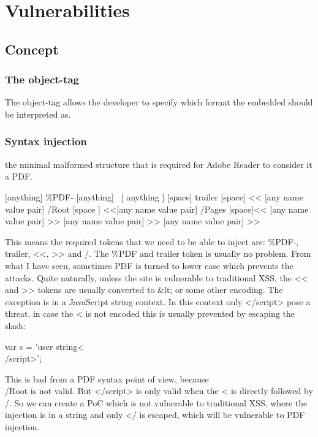 \documentclass[10pt, conference, compsocconf]{IEEEtran}
\begin{document}
\section{Vulnerabilities}


\subsection{Concept}



\subsubsection{The object-tag}

The object-tag allows the developer to specify which format 
the embedded should be interpreted as. 

\subsubsection{Syntax injection}

the minimal malformed structure that is required for Adobe 
Reader to consider it a PDF. 

[anything] \%PDF- [anything] \
[ anything ] [space] trailer [space] << [any name value pair] 
/Root [space ] <<[any name value pair] /Pages [space]<< [any name value pair] >> [any name value pair] >> [any name value pair] >>

This means the required tokens that we need to be able to 
inject are: \%PDF-, trailer, <<, >> and /.
The \%PDF and trailer token is usually no problem. From what 
I have seen, sometimes PDF is turned to lower case which 
prevents the attacks. Quite naturally, unless the site is 
vulnerable to traditional XSS, the << and >> tokens are usually 
converted to \&lt; or some other encoding. The exception is in 
a JavaScript string context. In this context only </script> 
pose a threat, in case the < is not encoded this is usually 
prevented by escaping the slash:

var s = 'user string<\\/script>';

This is bad from a PDF syntax point of view, because \\/Root is 
not valid. But </script> is only valid when the < is directly 
followed by /. So we can create a PoC which is not vulnerable to 
traditional XSS, where the injection is  in a string and only </ 
is escaped, which will be vulnerable to PDF injection.
\end{document}
